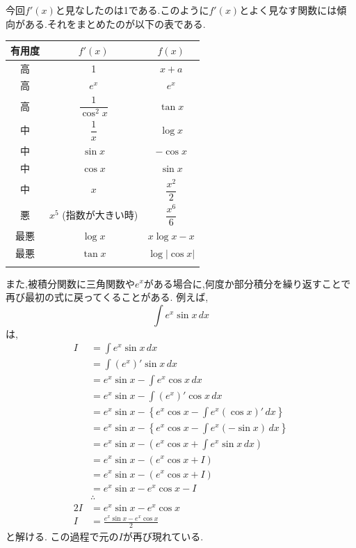 ﻿\documentclass[dvipdfmx,a4paper,11pt,fleqn]{jsarticle}
\begin{document}
今回$f'(x)$と見なしたのは1である.このように$f'(x)$とよく見なす関数には傾向がある.それをまとめたのが以下の表である.

\begin{table}[htbp]
    \renewcommand{\arraystretch}{1.7}
    \begin{tabular}{ccc}\Xhline{1.5pt}
        有用度 & $f'(x)$ & $f(x)$ \\ \hline
        高 & 1 & $x+a$ \\ 
        高 & $e^x$ & $e^x$ \\
        高 & $\dfrac{1}{\cos^2 x}$ & $\tan x$ \\
        中 & $\dfrac{1}{x}$ & $\log x$ \\
        中 & $\sin x$ & $-\cos x$ \\
        中 & $\cos x$ & $\sin x$ \\
        中 & $x$ & $\dfrac{x^2}{2}$ \\
        悪 & $x^5$ (指数が大きい時) & $\dfrac{x^6}{6}$ \\ 
        最悪 & $\log x$ & $x\log x-x$ \\
        最悪 & $\tan x$ & $\log|\cos x|$ \\\Xhline{1.5pt}
    \end{tabular}
        \renewcommand{\arraystretch}{1.0}
\end{table}

また,被積分関数に三角関数や$e^x$がある場合に,何度か部分積分を繰り返すことで再び最初の式に戻ってくることがある.
例えば,
\[
\int e^x \sin x \,dx
\]
は,
\begin{align*}
  I&=\int e^x \sin x \,dx  \\
  &=\int (e^x)' \sin x \,dx \\
  &=e^x \sin x -\int e^x \cos x \,dx\\
  &=e^x \sin x -\int (e^x)' \cos x \,dx\\
  &=e^x \sin x -\left\{ e^x \cos x -\int e^x (\cos x)' \,dx \right\} \\
  &=e^x \sin x -\left\{ e^x \cos x -\int e^x (-\sin x) \,dx \right\} \\
  &=e^x \sin x -\left( e^x \cos x +\int e^x \sin x \,dx \right) \\
  &=e^x \sin x -\left( e^x \cos x +I \right) \\
  &=e^x \sin x -\left( e^x \cos x +I \right) \\
  &=e^x \sin x -e^x \cos x -I \\
  &\therefore\\
  2I&=e^x \sin x - e^x \cos x\\
  I&=\frac{e^x \sin x - e^x \cos x}{2}
\end{align*}
と解ける.
この過程で元の$I$が再び現れている.
\end{document}
